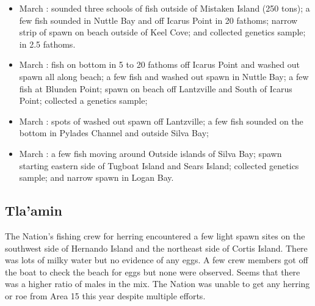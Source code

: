 \begin{itemize}
\item March : sounded three schools of fish
outside of Mistaken Island (250 tons);
a few fish sounded in Nuttle Bay and off Icarus Point in 20 fathoms;
narrow strip of spawn on beach outside of Keel Cove; and
collected genetics sample; in 2.5 fathoms.

\item March : fish on bottom in 5 to 20 fathoms off Icarus Point and
washed out spawn all along beach;
a few fish and washed out spawn in Nuttle  Bay;
a few fish at Blunden Point;
spawn on beach off Lantzville and South of Icarus Point;
collected a genetics sample;

\item March : spots of washed out spawn off Lantzville;
a few fish sounded on the bottom in Pylades Channel and outside Silva Bay;

\item March : a few fish moving around Outside islands of Silva Bay;
spawn starting eastern side of Tugboat Island and Sears Island;
collected genetics sample; and
narrow spawn in Logan Bay.

\end{itemize}

\subsection{Tla'amin}

The Nation's fishing crew for herring encountered a few light spawn sites on the
southwest side of Hernando Island and the northeast side of Cortis Island.
There was lots of milky water but no evidence of any eggs.
A few crew members got off the boat to check the beach for eggs
but none were observed. 
Seems that there was a higher ratio of males in the mix.
The Nation was unable to get any herring or roe
from Area 15 this year despite multiple efforts.
